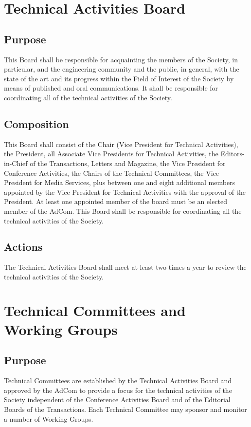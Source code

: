 \documentclass[10pt]{article}
\begin{document}
\section{Technical Activities Board}
\label{TAB}

\subsection{Purpose}

This Board shall be responsible for acquainting the members of the Society, in particular, and the engineering community and the public, in general, with the state of the art and its progress within the Field of Interest of the Society by means of published and oral communications. It shall be responsible for coordinating all of the technical activities of the Society.


\subsection{Composition}

This Board shall consist of the Chair (Vice President for Technical Activities), the President, all Associate Vice Presidents for Technical Activities, the Editors-in-Chief of the Transactions, Letters and Magazine, the Vice President for Conference Activities, the Chairs of the Technical Committees, the Vice President for Media Services, plus between one and eight additional members appointed by the Vice President for Technical Activities with the approval of the President. At least one appointed member of the board must be an elected member of the AdCom. This Board shall be responsible for coordinating all the technical activities of the Society.


\subsection{Actions}

The Technical Activities Board shall meet at least two times a year to review the technical activities of the Society. 


\section{Technical Committees and Working Groups}
\label{TCs}



\subsection{Purpose}
Technical Committees are established by the Technical Activities Board and approved by the AdCom to provide a focus for the technical activities of the Society independent of the Conference Activities Board and of the Editorial Boards of the Transactions. Each Technical Committee may sponsor and monitor a number of Working Groups.
\end{document}
